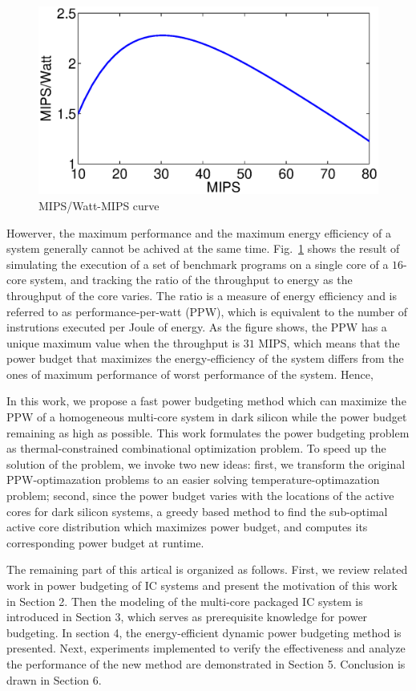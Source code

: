 \begin{figure}
\centering
\includegraphics[width=1\linewidth]{fig/ppw_mips.eps}
\caption{MIPS/Watt-MIPS curve}
\label{fig:ppw_mips}
\end{figure}

Howerver, the maximum performance and the maximum energy efficiency of a system generally cannot be achived at the same time. Fig.~\ref{fig:ppw_mips} shows the result of simulating the execution of a set of benchmark programs on a single core of a $16$-core system, and tracking the ratio of the throughput to energy as the throughput of the core varies. The ratio is a measure of energy efficiency and is referred to as performance-per-watt (PPW), which is equivalent to the number of instrutions executed per Joule of energy. As the figure shows, the PPW has a unique maximum value when the throughput is $31$ MIPS, which means that the power budget that maximizes the energy-efficiency of the system differs from the ones of maximum performance of worst performance of the system. Hence, 


In this work, we propose a fast power budgeting method which can maximize the PPW of a homogeneous multi-core system in dark silicon while the power budget remaining as high as possible. This work formulates the power budgeting problem as thermal-constrained combinational optimization problem. To speed up the solution of the problem, we invoke two new ideas: first, we transform the original PPW-optimazation problems to an easier solving temperature-optimazation problem; second, since the power budget varies with the locations of the active cores for dark silicon systems, a greedy based method to find the sub-optimal active core distribution which maximizes power budget, and computes its corresponding power budget at runtime.

The remaining part of this artical is organized as follows. First, we review related work in power budgeting of IC systems and present the motivation of this work in Section 2. Then the modeling of the multi-core packaged IC system is introduced in Section 3, which serves as prerequisite knowledge for power budgeting. In section 4, the energy-efficient dynamic power budgeting method is presented. Next, experiments implemented to verify the effectiveness and analyze the performance of the new method are demonstrated in Section 5. Conclusion is drawn in Section 6.